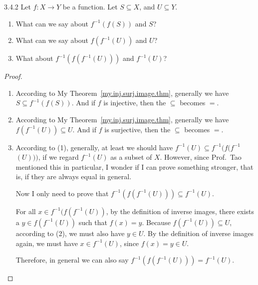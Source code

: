 \begin{exercise}{3.4.2}
	Let $f: X \to Y$ be a function. Let $S \subseteq X$, and $U \subseteq Y$.
	\begin{enumerate}
		\item What can we say about $f^{-1}(f(S))$ and $S$?
		\item What can we say about $f(f^{-1}(U))$ and $U$?
		\item What about $f^{-1}(f(f^{-1}(U)))$ and $f^{-1}(U)$?
	\end{enumerate}
\end{exercise}
\begin{proof}\leavevmode
	\begin{enumerate}
		\item According to My Theorem~\ref{my.inj.surj.image.thm}, generally we have $S \subseteq f^{-1}(f(S))$. And if $f$ is injective, then the $\subseteq$ becomes $=$.
		
		\item According to My Theorem~\ref{my.inj.surj.image.thm}, generally we have $f(f^{-1}(U)) \subseteq U$. And if $f$ is surjective, then the $\subseteq$ becomes $=$.
		
		\item According to (1), generally, at least we should have $f^{-1}(U) \subseteq f^{-1}$\discretionary{}{}{}$(f(f^{-1}$\discretionary{}{}{}$(U)))$, if we regard $f^{-1}(U)$ as a subset of $X$. However, since Prof.~Tao mentioned this in particular, I wonder if I can prove something stronger, that is, if they are always equal in general.
		
		Now I only need to prove that $f^{-1}(f(f^{-1}(U))) \subseteq f^{-1}(U)$.
		
		For all $x \in f^{-1}(f(f^{-1}(U))$, by the definition of inverse images, there exists a $y \in f(f^{-1}(U))$ such that $f(x) = y$. Because $f(f^{-1}(U)) \subseteq U$, according to (2), we must also have $y \in U$. By the definition of inverse images again, we must have $x \in f^{-1}(U)$, since $f(x) = y \in U$.
		
		Therefore, in general we can also say $f^{-1}(f(f^{-1}(U))) = f^{-1}(U)$.
	\end{enumerate}
\end{proof}

